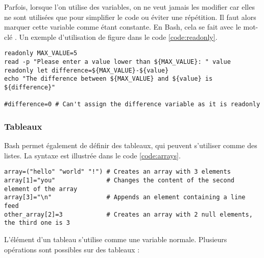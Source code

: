 Parfois, lorsque l'on utilise des variables, on ne veut jamais les modifier car elles ne sont utilisées que pour simplifier le code ou éviter une répétition. Il faut alors marquer cette variable comme étant constante. En Bash, cela se fait avec le mot-clé . Un exemple d'utilisation de  figure dans le code \ref{code:readonly}.
\begin{code}
    \begin{verbatim}
readonly MAX_VALUE=5
read -p "Please enter a value lower than ${MAX_VALUE}: " value
readonly let difference=${MAX_VALUE}-${value}
echo "The difference between ${MAX_VALUE} and ${value} is ${difference}"

#difference=0 # Can't assign the difference variable as it is readonly
    \end{verbatim}
    
    \vspace{-0.5cm}
    \label{code:readonly}
\end{code}

\subsubsection{Tableaux} \label{sec:arrays}

Bash permet également de définir des tableaux, qui peuvent s'utiliser comme des listes. La syntaxe est illustrée dans le code \ref{code:arrays}.
\begin{code}
    \begin{verbatim}
array=("hello" "world" "!") # Creates an array with 3 elements
array[1]="you"              # Changes the content of the second element of the array
array[3]="\n"               # Appends an element containing a line feed
other_array[2]=3            # Creates an array with 2 null elements, the third one is 3
    \end{verbatim}
    
    \vspace{-0.5cm}
    \label{code:arrays}
\end{code}

L'élément d'un tableau s'utilise comme une variable normale. Plusieurs opérations sont possibles sur des tableaux : 

